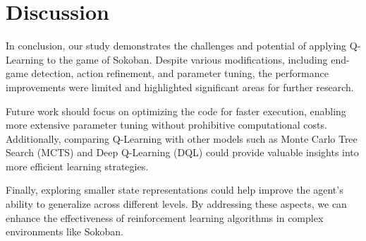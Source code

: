\documentclass[10pt,twocolumn]{article}
\begin{document}
\section{Discussion}

In conclusion, our study demonstrates the challenges and potential of applying Q-Learning to the game of Sokoban. Despite various modifications, including end-game detection, action refinement, and parameter tuning, the performance improvements were limited and highlighted significant areas for further research.

Future work should focus on optimizing the code for faster execution, enabling more extensive parameter tuning without prohibitive computational costs. Additionally, comparing Q-Learning with other models such as Monte Carlo Tree Search (MCTS) and Deep Q-Learning (DQL) could provide valuable insights into more efficient learning strategies.

Finally, exploring smaller state representations could help improve the agent's ability to generalize across different levels. By addressing these aspects, we can enhance the effectiveness of reinforcement learning algorithms in complex environments like Sokoban.

\printbibliography
\end{document}
